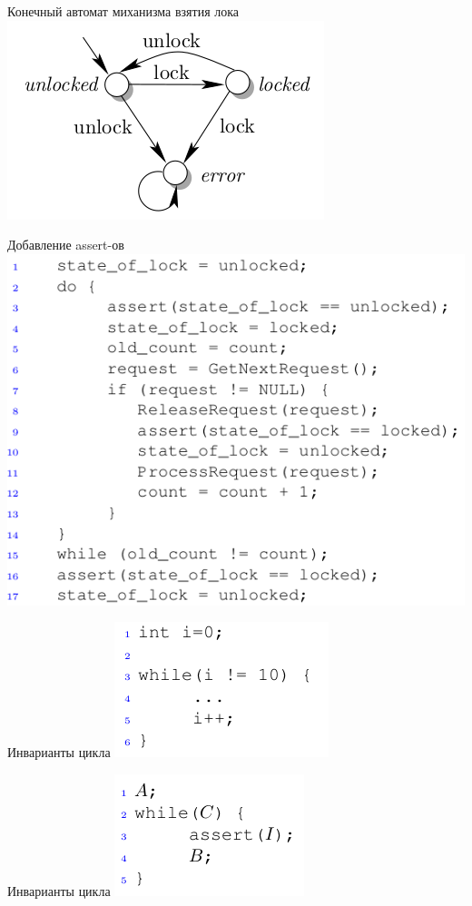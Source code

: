 \documentclass{beamer}
\begin{document}
\begin{frame}{Конечный автомат миханизма взятия лока}
\includegraphics[scale=0.5]{lock_automaton.png}
\end{frame}

\begin{frame}{Добавление assert-ов}
\includegraphics[scale=0.5]{asserts.png}
\end{frame}

\begin{frame}{Инварианты цикла}
\includegraphics[scale=0.45]{li1.png}
\end{frame}

\begin{frame}{Инварианты цикла}
\includegraphics[scale=0.45]{li2.png}
\end{frame}
\end{document}
